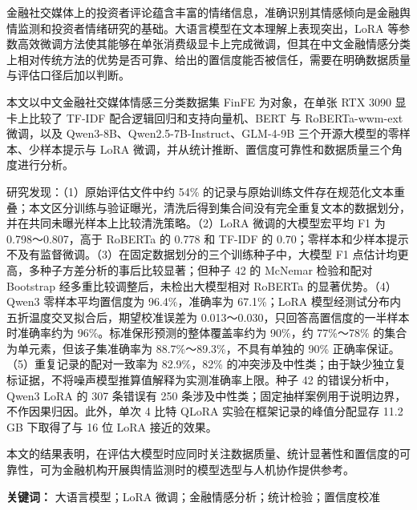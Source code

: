 金融社交媒体上的投资者评论蕴含丰富的情绪信息，准确识别其情感倾向是金融舆情监测和投资者情绪研究的基础。大语言模型在文本理解上表现突出，LoRA 等参数高效微调方法使其能够在单张消费级显卡上完成微调，但其在中文金融情感分类上相对传统方法的优势是否可靠、给出的置信度能否被信任，需要在明确数据质量与评估口径后加以判断。

本文以中文金融社交媒体情感三分类数据集 FinFE 为对象，在单张 RTX 3090 显卡上比较了 TF-IDF 配合逻辑回归和支持向量机、BERT 与 RoBERTa-wwm-ext 微调，以及 Qwen3-8B、Qwen2.5-7B-Instruct、GLM-4-9B 三个开源大模型的零样本、少样本提示与 LoRA 微调，并从统计推断、置信度可靠性和数据质量三个角度进行分析。

研究发现：（1）原始评估文件中约 54\% 的记录与原始训练文件存在规范化文本重叠；本文区分训练与验证曝光，清洗后得到集合间没有完全重复文本的数据划分，并在共同未曝光样本上比较清洗策略。（2）LoRA 微调的大模型宏平均 F1 为 0.798～0.807，高于 RoBERTa 的 0.778 和 TF-IDF 的 0.70；零样本和少样本提示不及有监督微调。（3）在固定数据划分的三个训练种子中，大模型 F1 点估计均更高，多种子方差分析的事后比较显著；但种子 42 的 McNemar 检验和配对 Bootstrap 经多重比较调整后，未检出大模型相对 RoBERTa 的显著优势。（4）Qwen3 零样本平均置信度为 96.4\%，准确率为 67.1\%；LoRA 模型经测试分布内五折温度交叉拟合后，期望校准误差为 0.013～0.030，只回答高置信度的一半样本时准确率约为 96\%。标准保形预测的整体覆盖率约为 90\%，约 77\%～78\% 的集合为单元素，但该子集准确率为 88.7\%～89.3\%，不具有单独的 90\% 正确率保证。（5）重复记录的配对一致率为 82.9\%，82\% 的冲突涉及中性类；由于缺少独立复标证据，不将噪声模型推算值解释为实测准确率上限。种子 42 的错误分析中，Qwen3 LoRA 的 307 条错误有 250 条涉及中性类；固定抽样案例用于说明边界，不作因果归因。此外，单次 4 比特 QLoRA 实验在框架记录的峰值分配显存 11.2 GB 下取得了与 16 位 LoRA 接近的效果。

本文的结果表明，在评估大模型时应同时关注数据质量、统计显著性和置信度的可靠性，可为金融机构开展舆情监测时的模型选型与人机协作提供参考。

\textbf{关键词：} 大语言模型；LoRA 微调；金融情感分析；统计检验；置信度校准
